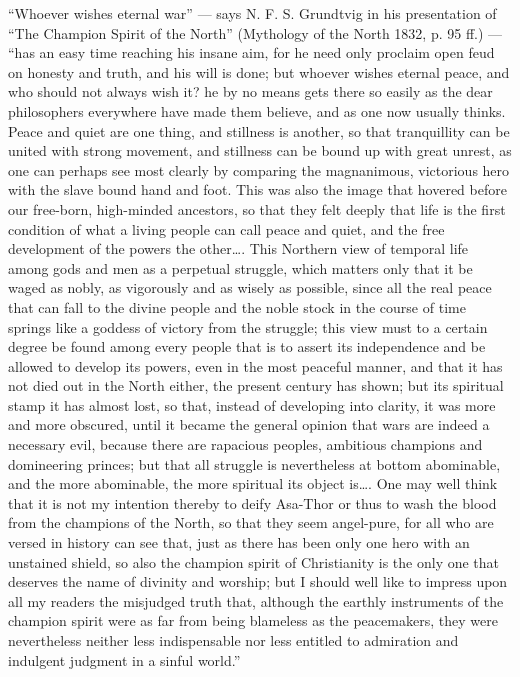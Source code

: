 \documentclass[12pt,a4paper,openany]{book}
\newcommand{\opage}[1]{\marginnote{\footnotesize\textit{[#1]}}}
\begin{document}
``Whoever wishes eternal war'' --- says N. F. S.
Grundtvig in his presentation of ``The Champion Spirit of the North''
(Mythology of the North 1832, p. 95 ff.) --- ``has an easy time
reaching his insane aim, for he need only
proclaim open feud on honesty and truth, and his
will is done; but whoever wishes eternal peace, and who
should not always wish it? he by no means gets
there so easily as the dear philosophers everywhere have
made them believe, and as one now usually thinks. Peace and
quiet are one thing, and stillness is another, so that tranquillity
can be united with strong movement, and stillness can
be bound up with great unrest, as one can perhaps see most clearly
by comparing the magnanimous, victorious hero with
the slave bound hand and foot. This was also the image that
hovered before our free-born, high-minded ancestors, so
that they felt deeply that life is the first condition of what
a living people can call peace and quiet, and the free
\setcounter{footnote}{0}%
\opage{423}development of the powers the other\dots{}. This Northern view of
temporal life among gods and men as a perpetual
struggle, which matters only that it be waged as nobly,
as vigorously and as wisely as possible, since all the real
peace that can fall to the divine people and the noble stock in
the course of time springs like a goddess of victory from the struggle;
this view must to a certain degree be found among
every people that is to assert its independence and
be allowed to develop its powers, even in the most peaceful
manner, and that it has not died out in the North either,
the present century has shown; but its spiritual stamp
it has almost lost, so that, instead of developing into
clarity, it was more and more obscured, until it became
the general opinion that wars are indeed a necessary
evil, because there are rapacious peoples, ambitious champions
and domineering princes; but that all struggle is nevertheless
at bottom abominable, and the more abominable, the more spiritual
its object is\dots{}. One may well think that it is
not my intention thereby to deify Asa-Thor or thus
to wash the blood from the champions of the North, so that they seem
angel-pure, for all who are versed in history can see that, just as
there has been only one hero with an unstained shield,
so also the champion spirit of Christianity is the
only one that deserves the name of divinity and worship; but
I should well like to impress upon all my readers the
misjudged truth that, although the earthly
instruments of the champion spirit were as far from being blameless as
the peacemakers, they were nevertheless neither less
indispensable nor less entitled to admiration and
indulgent judgment in a sinful world.''
\end{document}
